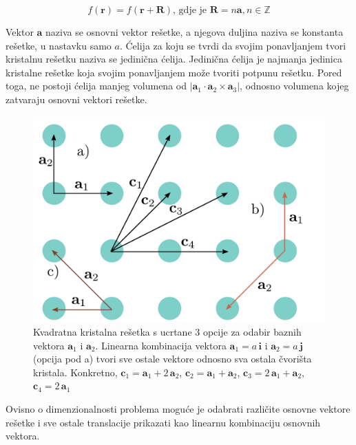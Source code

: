 \documentclass[utf8, seminar, numeric]{fer}
\begin{document}
\begin{equation}
	f(\mathbf{r}) = f(\mathbf{r} + \mathbf{R}) \text{, gdje je }{\mathbf{R} =
	n\mathbf{a}}, n \in \mathbb{Z}
\end{equation}

Vektor $\mathbf{a}$ naziva se osnovni vektor rešetke, a njegova duljina
naziva se konstanta rešetke, u nastavku samo $a$. Ćelija za koju se tvrdi
da svojim ponavljanjem tvori kristalnu rešetku naziva se jedinična ćelija.
Jedinična ćelija je najmanja jedinica kristalne rešetke koja svojim
ponavljanjem može tvoriti potpunu rešetku. Pored toga, ne postoji ćelija manjeg
volumena od ${|\mathbf{a}_1 \cdot \mathbf{a}_2 \times \mathbf{a}_3|}$, odnosno
volumena kojeg zatvaraju osnovni vektori rešetke.

\begin{figure}[ht]
	\centering
	\includegraphics[width = 1.0\linewidth]{./images/pdf/crystal_lattice.pdf}
	\caption{Kvadratna kristalna rešetka s ucrtane 3 opcije za odabir baznih
	vektora $\mathbf{a}_1$ i $\mathbf{a}_2$. Linearna kombinacija vektora
	$\mathbf{a}_1 = a \, \mathbf{i}$ i $\mathbf{a}_2 = a \, \mathbf{j}$ (opcija
	pod a) tvori sve ostale vektore odnosno sva ostala čvorišta kristala.
	Konkretno,
	${\mathbf{c}_1 = \mathbf{a}_1 + 2 \, \mathbf{a}_2}$,
	${\mathbf{c}_2 = \mathbf{a}_1 + \mathbf{a}_2}$,
	${\mathbf{c}_3 = 2 \, \mathbf{a}_1 + \mathbf{a}_2}$,
	${\mathbf{c}_4 = 2 \, \mathbf{a}_1}$}
	\label{fig:crystal_lattice}
\end{figure}

Ovisno o dimenzionalnosti problema moguće je odabrati različite osnovne
vektore rešetke i sve ostale translacije prikazati kao linearnu kombinaciju
osnovnih vektora.
\end{document}

